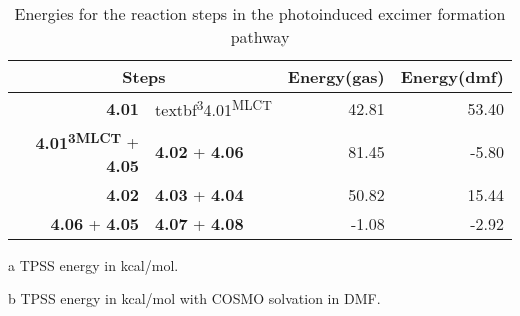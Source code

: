 \begin{table}[!htb]
\centering
 \begin{threeparttable}
  \caption{Energies for the reaction steps in the photoinduced excimer formation pathway}
    \begin{tabular}{r@{ $\rightarrow$ }lrr}
    \toprule
    \multicolumn{2}{c}{Steps} & Energy(gas)\tnote{a} & Energy(dmf)\tnote{b} \\
    \midrule
    \textbf{4.01} & textbf{\textsuperscript{3}4.01\textsuperscript{MLCT}} & 42.81 & 53.40 \\
    \textbf{4.01\textsuperscript{3MLCT}} + \textbf{4.05} & \textbf{4.02} + \textbf{4.06} & 81.45 & -5.80 \\
    \textbf{4.02} & \textbf{4.03} + \textbf{4.04} & 50.82 & 15.44 \\
    \textbf{4.06} + \textbf{4.05} & \textbf{4.07} + \textbf{4.08} & -1.08 & -2.92 \\
    \bottomrule
    \end{tabular}%
    \begin{tablenotes}
    \item [a] TPSS energy in kcal/mol.
    \item [b] TPSS energy in kcal/mol with COSMO solvation in DMF.
    \end{tablenotes}
  \label{tab.suprxn}%
 \end{threeparttable}
\end{table}%


